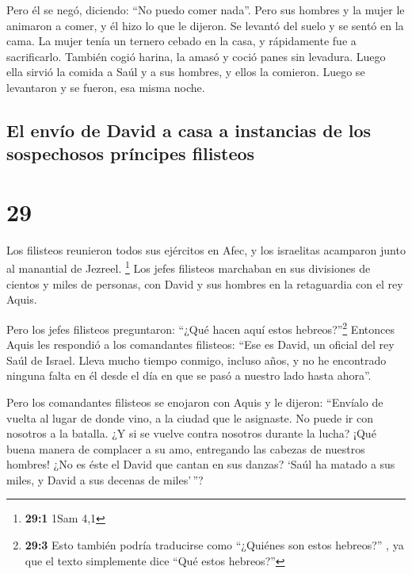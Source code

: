  Pero él se negó, diciendo: ``No puedo comer nada''. Pero
sus hombres y la mujer le animaron a comer, y él hizo lo que le dijeron.
Se levantó del suelo y se sentó en la cama.  La mujer
tenía un ternero cebado en la casa, y rápidamente fue a sacrificarlo.
También cogió harina, la amasó y coció panes sin levadura.
 Luego ella sirvió la comida a Saúl y a sus hombres, y
ellos la comieron. Luego se levantaron y se fueron, esa misma noche.

\hypertarget{el-envuxedo-de-david-a-casa-a-instancias-de-los-sospechosos-pruxedncipes-filisteos}{%
\subsection{El envío de David a casa a instancias de los sospechosos
príncipes
filisteos}\label{el-envuxedo-de-david-a-casa-a-instancias-de-los-sospechosos-pruxedncipes-filisteos}}

\hypertarget{section-28}{%
\section{29}\label{section-28}}

 Los filisteos reunieron todos sus ejércitos en Afec, y
los israelitas acamparon junto al manantial de Jezreel. \footnote{\textbf{29:1}
  1Sam 4,1}  Los jefes filisteos marchaban en sus
divisiones de cientos y miles de personas, con David y sus hombres en la
retaguardia con el rey Aquis.

 Pero los jefes filisteos preguntaron: ``¿Qué hacen aquí
estos hebreos?''\footnote{\textbf{29:3} Esto también podría traducirse
  como ``¿Quiénes son estos hebreos?'' , ya que el texto simplemente
  dice ``Qué estos hebreos?''} Entonces Aquis les respondió a los
comandantes filisteos: ``Ese es David, un oficial del rey Saúl de
Israel. Lleva mucho tiempo conmigo, incluso años, y no he encontrado
ninguna falta en él desde el día en que se pasó a nuestro lado hasta
ahora''.

 Pero los comandantes filisteos se enojaron con Aquis y le
dijeron: ``Envíalo de vuelta al lugar de donde vino, a la ciudad que le
asignaste. No puede ir con nosotros a la batalla. ¿Y si se vuelve contra
nosotros durante la lucha? ¡Qué buena manera de complacer a su amo,
entregando las cabezas de nuestros hombres!  ¿No es éste
el David que cantan en sus danzas? `Saúl ha matado a sus miles, y David
a sus decenas de miles'\,''?

